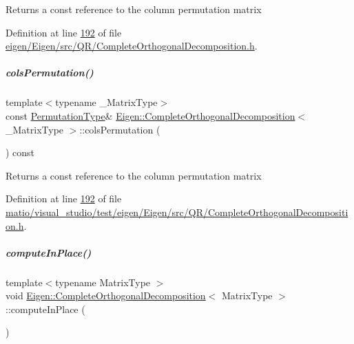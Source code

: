 \begin{DoxyReturn}{Returns}
a const reference to the column permutation matrix 
\end{DoxyReturn}


Definition at line \hyperlink{eigen_2_eigen_2src_2_q_r_2_complete_orthogonal_decomposition_8h_source_l00192}{192} of file \hyperlink{eigen_2_eigen_2src_2_q_r_2_complete_orthogonal_decomposition_8h_source}{eigen/\+Eigen/src/\+Q\+R/\+Complete\+Orthogonal\+Decomposition.\+h}.

\mbox{\label{group___q_r___module_a601c67a4a0bbe9c7b25b885279db9ff2}} 
\subparagraph{\texorpdfstring{cols\+Permutation()}{colsPermutation()}\hspace{0.1cm}{\footnotesize\ttfamily [2/2]}}
{\footnotesize\ttfamily template$<$typename \+\_\+\+Matrix\+Type$>$ \\
const \hyperlink{group___core___module}{Permutation\+Type}\& \hyperlink{group___q_r___module_class_eigen_1_1_complete_orthogonal_decomposition}{Eigen\+::\+Complete\+Orthogonal\+Decomposition}$<$ \+\_\+\+Matrix\+Type $>$\+::cols\+Permutation (\begin{DoxyParamCaption}{ }\end{DoxyParamCaption}) const\hspace{0.3cm}{\ttfamily [inline]}}

\begin{DoxyReturn}{Returns}
a const reference to the column permutation matrix 
\end{DoxyReturn}


Definition at line \hyperlink{matio_2visual__studio_2test_2eigen_2_eigen_2src_2_q_r_2_complete_orthogonal_decomposition_8h_source_l00192}{192} of file \hyperlink{matio_2visual__studio_2test_2eigen_2_eigen_2src_2_q_r_2_complete_orthogonal_decomposition_8h_source}{matio/visual\+\_\+studio/test/eigen/\+Eigen/src/\+Q\+R/\+Complete\+Orthogonal\+Decomposition.\+h}.

\mbox{\label{group___q_r___module_adb0b963d7d8f96492904e8eda03efbf5}} 
\subparagraph{\texorpdfstring{compute\+In\+Place()}{computeInPlace()}}
{\footnotesize\ttfamily template$<$typename Matrix\+Type $>$ \\
void \hyperlink{group___q_r___module_class_eigen_1_1_complete_orthogonal_decomposition}{Eigen\+::\+Complete\+Orthogonal\+Decomposition}$<$ Matrix\+Type $>$\+::compute\+In\+Place (\begin{DoxyParamCaption}{ }\end{DoxyParamCaption})\hspace{0.3cm}{\ttfamily [protected]}}


